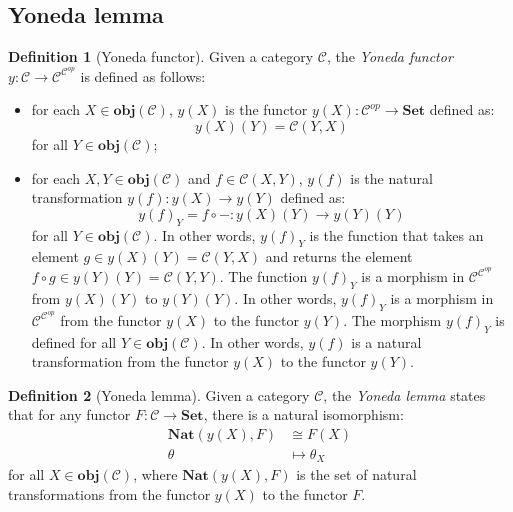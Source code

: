 \documentclass[12pt,twoside,a4paper]{report}
\theoremstyle{definition}
\newtheorem*{definition*}{Definition}
\begin{document}
        \subsection{Yoneda lemma}
        \begin{definition*}[Yoneda functor]
            Given a category $\mathcal{C}$, the \emph{Yoneda functor} $y: \mathcal{C} \to \mathcal{C}^{\mathcal{C}^{op}}$ is defined as follows:
            \begin{itemize}
                \item 
                    for each $X \in \textbf{obj}(\mathcal{C})$, $y(X)$ is the functor $y(X): \mathcal{C}^{op} \to \textbf{Set}$ defined as:
                    \[ y(X)(Y) = \mathcal{C}{(Y,X)} \]
                    for all $Y \in \textbf{obj}(\mathcal{C})$;
                \item
                    for each $X, Y \in \textbf{obj}(\mathcal{C})$ and $f \in \mathcal{C}{(X,Y)}$, $y(f)$ is the natural transformation $y(f): y(X) \to y(Y)$ defined as:
                    \[ y(f)_Y = f \circ - : y(X)(Y) \to y(Y)(Y) \]
                    for all $Y \in \textbf{obj}(\mathcal{C})$.
                    In other words, $y(f)_Y$ is the function that takes an element $g \in y(X)(Y) = \mathcal{C}{(Y,X)}$ and returns the element $f \circ g \in y(Y)(Y) = \mathcal{C}{(Y,Y)}$.
                    The function $y(f)_Y$ is a morphism in $\mathcal{C}^{\mathcal{C}^{op}}$ from $y(X)(Y)$ to $y(Y)(Y)$.
                    In other words, $y(f)_Y$ is a morphism in $\mathcal{C}^{\mathcal{C}^{op}}$ from the functor $y(X)$ to the functor $y(Y)$.
                    The morphism $y(f)_Y$ is defined for all $Y \in \textbf{obj}(\mathcal{C})$.
                    In other words, $y(f)$ is a natural transformation from the functor $y(X)$ to the functor $y(Y)$.
            \end{itemize}
        \end{definition*}

        \begin{definition*}[Yoneda lemma]
            Given a category $\mathcal{C}$, the \emph{Yoneda lemma} states that for any functor $F: \mathcal{C} \to \textbf{Set}$, there is a natural isomorphism:
            \[ \begin{aligned}
                \textbf{Nat}(y(X),F) &\cong F(X) \\
                \theta &\mapsto \theta_X
            \end{aligned} \]
            for all $X \in \textbf{obj}(\mathcal{C})$, where $\textbf{Nat}(y(X),F)$ is the set of natural transformations from the functor $y(X)$ to the functor $F$.
        \end{definition*}
\end{document}
